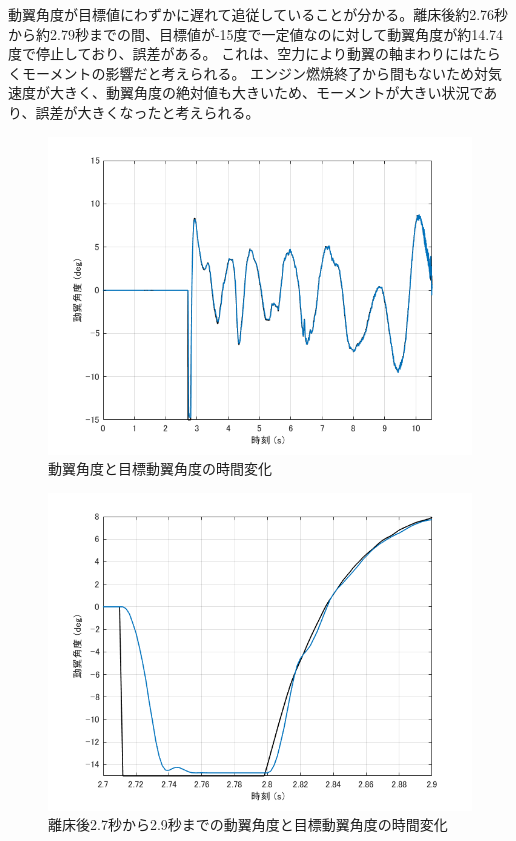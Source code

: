 \documentclass[a4paper,11pt,titlepage,uplatex]{jsarticle}
\begin{document}
動翼角度が目標値にわずかに遅れて追従していることが分かる。離床後約2.76秒から約2.79秒までの間、目標値が-15度で一定値なのに対して動翼角度が約14.74度で停止しており、誤差がある。
これは、空力により動翼の軸まわりにはたらくモーメントの影響だと考えられる。
エンジン燃焼終了から間もないため対気速度が大きく、動翼角度の絶対値も大きいため、モーメントが大きい状況であり、誤差が大きくなったと考えられる。
\begin{figure}[H]
	\centering
	\includegraphics[width=0.8\linewidth]{pic_avi/動翼角度.png}
	\caption{動翼角度と目標動翼角度の時間変化}
	\label{fig:動翼角度}
\end{figure}
\begin{figure}[H]
	\centering
	\includegraphics[width=0.8\linewidth]{pic_avi/動翼角度_切り取り.png}
	\caption{離床後2.7秒から2.9秒までの動翼角度と目標動翼角度の時間変化}
	\label{fig:動翼角度_切り取り}
\end{figure}
\end{document}

